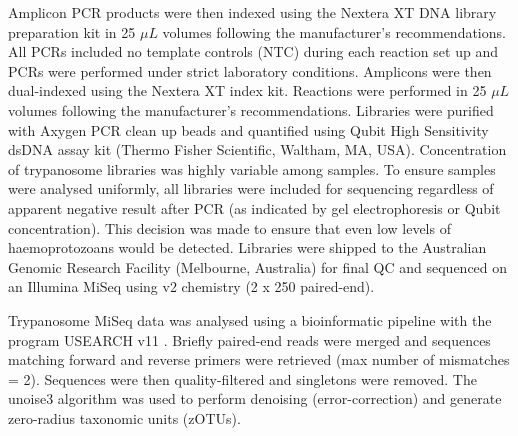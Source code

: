 \documentclass[a4paper, nobind]{templates/ociamthesis}
\begin{document}
Amplicon PCR products were then indexed using the Nextera XT DNA library preparation kit in 25 \(\mu L\) volumes following the manufacturer's recommendations.
All PCRs included no template controls (NTC) during each reaction set up and PCRs were performed under strict laboratory conditions.
Amplicons were then dual-indexed using the Nextera XT index kit.
Reactions were performed in 25 \(\mu L\) volumes following the manufacturer's recommendations.
Libraries were purified with Axygen PCR clean up beads and quantified using Qubit High Sensitivity dsDNA assay kit (Thermo Fisher Scientific, Waltham, MA, USA).
Concentration of trypanosome libraries was highly variable among samples.
To ensure samples were analysed uniformly, all libraries were included for sequencing regardless of apparent negative result after PCR (as indicated by gel electrophoresis or Qubit concentration).
This decision was made to ensure that even low levels of haemoprotozoans would be detected.
Libraries were shipped to the Australian Genomic Research Facility (Melbourne, Australia) for final QC and sequenced on an Illumina MiSeq using v2 chemistry (2 x 250 paired-end).

Trypanosome MiSeq data was analysed using a bioinformatic pipeline with the program USEARCH v11 \autocite{edgarSearchClusteringOrders2010}.
Briefly paired-end reads were merged and sequences matching forward and reverse primers were retrieved (max number of mismatches = 2).
Sequences were then quality-filtered and singletons were removed.
The unoise3 \autocite{edgarUNOISE2ImprovedErrorcorrection2016} algorithm was used to perform denoising (error-correction) and generate zero-radius taxonomic units (zOTUs).
\end{document}
